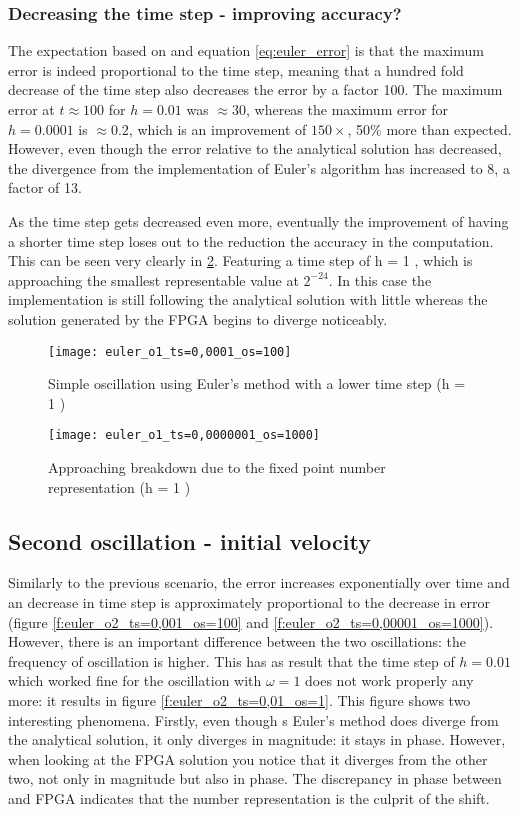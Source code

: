 \subsubsection{Decreasing the time step - improving accuracy?}
The expectation based on \cite{DE} and equation \ref{eq:euler_error} is that the maximum error is indeed proportional to the time step, meaning that a hundred fold decrease of the time step also decreases the error by a factor 100. The maximum error at $t \approx 100$ for $h = 0.01$ was $\approx 30$, whereas the maximum error for $h = 0.0001$ is $\approx 0.2$, which is an improvement of $150 \times$, 50\% more than expected. However, even though the error relative to the analytical solution has decreased, the divergence from the \matlab{} implementation of Euler's algorithm has increased to 8, a factor of 13.

As the time step gets decreased even more, eventually the improvement of having a shorter time step loses out to the reduction the accuracy in the computation. This can be seen very clearly in \ref{f:euler_o1_ts=0,0000001_os=1000}. Featuring a time step of h = 1 , which is approaching the smallest representable value at $2^{-24}$. In this case the \matlab{} implementation is still following the analytical solution with little whereas the solution generated by the FPGA begins to diverge noticeably.

\begin{figure}[h]
	\centering
	\texttt{[image: euler\_o1\_ts=0,0001\_os=100]}
	\caption{Simple oscillation using Euler's method with a lower time step (h = 1 )}
	\label{f:euler_o1_ts=0,0001_os=100}
\end{figure}

\begin{figure}[h]
	\centering
	\texttt{[image: euler\_o1\_ts=0,0000001\_os=1000]}
	\caption{Approaching breakdown due to the fixed point number representation (h = 1 )}
	\label{f:euler_o1_ts=0,0000001_os=1000}
\end{figure}

\subsection{Second oscillation - initial velocity}
Similarly to the previous scenario, the error increases exponentially over time and an decrease in time step is approximately proportional to the decrease in error (figure \ref{f:euler_o2_ts=0,001_os=100} and \ref{f:euler_o2_ts=0,00001_os=1000}). However, there is an important difference between the two oscillations: the frequency of oscillation is higher. This has as result that the time step of $h = 0.01$ which worked fine for the oscillation with $\omega = 1$ does not work properly any more: it results in figure \ref{f:euler_o2_ts=0,01_os=1}. This figure shows two interesting phenomena. Firstly, even though \matlab{}s Euler's method does diverge from the analytical solution, it only diverges in magnitude: it stays in phase. However, when looking at the FPGA solution you notice that it diverges from the other two, not only in magnitude but also in phase. The discrepancy in phase between \matlab{} and FPGA indicates that the number representation is the culprit of the shift. 

